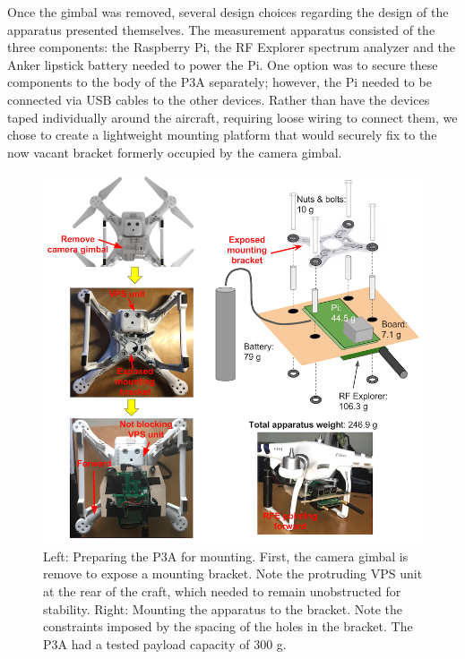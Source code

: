 \documentclass[pageno]{jpaper}
\begin{document}
 Once the gimbal was removed, several design choices regarding the design of the apparatus presented themselves. The measurement apparatus consisted of the three components: the Raspberry Pi, the RF Explorer spectrum analyzer and the Anker lipstick battery needed to power the Pi. One option was to secure these components to the body of the P3A separately; however, the Pi needed to be connected via USB cables to the other devices. Rather than have the devices taped individually around the aircraft, requiring loose wiring to connect them, we chose to create a lightweight mounting platform that would securely fix to the now vacant bracket formerly occupied by the camera gimbal.
 
\begin{figure}
	\caption{Left: Preparing the P3A for mounting. First, the camera gimbal is remove to expose a mounting bracket. Note the protruding VPS unit at the rear of the craft, which needed to remain unobstructed for stability. Right: Mounting the apparatus to the bracket. Note the constraints imposed by the spacing of the holes in the bracket. The P3A had a tested payload capacity of 300 g.}
	\centerline{\includegraphics{mounting}}
\end{figure}
\end{document}
